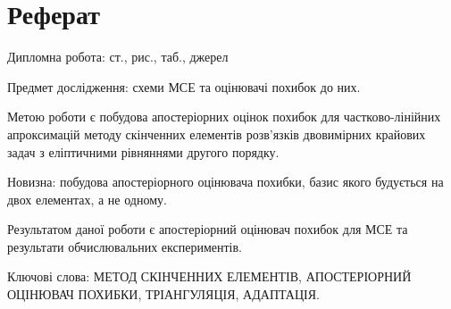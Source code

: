 
\section*{Реферат}

Дипломна робота: \pageref{LastPage} ст.,  рис.,  таб.,  джерел

Предмет дослідження: схеми МСЕ та оцінювачі похибок до них.

Метою роботи є побудова апостеріорних оцінок похибок для частково-лінійних апроксимацій методу скінченних елементів розв'язків двовимірних крайових задач з еліптичними рівняннями другого порядку.

Новизна: побудова апостеріорного оцінювача похибки, базис якого будується на двох елементах, а не одному.

Результатом даної роботи є апостеріорний оцінювач похибок для МСЕ та результати обчислювальних експериментів.

Ключові слова: \MakeTextUppercase{метод скінченних елементів, апостеріорний оцінювач похибки, тріангуляція, адаптація}.

